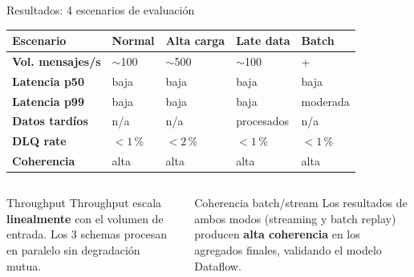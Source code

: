 \documentclass[aspectratio=169, 10pt]{beamer}
\begin{document}
\begin{frame}[shrink=5]{Resultados: 4 escenarios de evaluaci\'on}
  \vspace{-4pt}
  \renewcommand{\arraystretch}{1.3}
  \begin{center}
  \begin{tabular}{>{\bfseries\small}l
                  >{\small\centering\arraybackslash}p{2.2cm}
                  >{\small\centering\arraybackslash}p{2.2cm}
                  >{\small\centering\arraybackslash}p{2.2cm}
                  >{\small\centering\arraybackslash}p{2.2cm}}
    \toprule
    \textbf{Escenario}
      & \textbf{Normal}
      & \textbf{Alta carga}
      & \textbf{Late data}
      & \textbf{Batch} \\
    \midrule
    Vol. mensajes/s & $\sim$100 & $\sim$500 & $\sim$100 & 500+ \\
    Latencia p50 & baja & baja & baja & baja \\
    Latencia p99 & baja & baja & baja & moderada \\
    Datos tard\'ios & n/a & n/a & \textcolor{successgreen}{procesados} & n/a \\
    DLQ rate & $<1$\,\% & $<2$\,\% & $<1$\,\% & $<1$\,\% \\
    Coherencia & \textcolor{successgreen}{alta} & \textcolor{successgreen}{alta}
               & \textcolor{successgreen}{alta} & \textcolor{successgreen}{alta} \\
    \bottomrule
  \end{tabular}
  \end{center}
  \vspace{4pt}
  \begin{columns}[t]
      \begin{exampleblock}{Throughput}
        \small
        Throughput escala \textbf{linealmente} con el volumen de entrada.
        Los 3 schemas procesan en paralelo sin degradaci\'on mutua.
      \end{exampleblock}
      \begin{block}{Coherencia batch/stream}
        \small
        Los resultados de ambos modos (streaming y batch replay)
        producen \textbf{alta coherencia} en los agregados finales,
        validando el modelo Dataflow.
      \end{block}
  \end{columns}
\end{frame}
\end{document}
